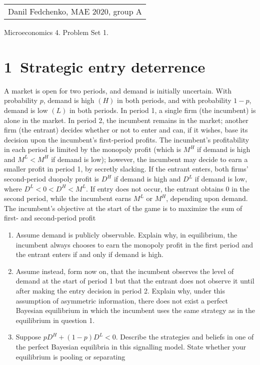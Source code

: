 \documentclass[a4paper]{article}
\begin{document}
	\begin{flushright}
	\begin{tabular}{r}
		Danil Fedchenko, MAE 2020, group A \\
	\end{tabular}
\end{flushright}


\begin{center}
	Microeconomics 4. Problem Set 1.
\end{center}
\section*{1\ Strategic entry deterrence}
A market is open for two periods, and demand is initially uncertain. With probability $p$,
demand is high $(H)$ in both periods, and with probability $1-p$, demand is low $(L)$ in both
periods. In period 1, a single firm (the incumbent) is alone in the market. In period 2,
the incumbent remains in the market; another firm (the entrant) decides whether or not
to enter and can, if it wishes, base its decision upon the incumbent's first-period profits.
The incumbent's profitability in each period is limited by the monopoly profit (which is
$M^H$ if demand is high and $M^L < M^H$ if demand is low); however, the incumbent may
decide to earn a smaller profit in period 1, by secretly slacking. If the entrant enters,
both firms' second-period duopoly profit is $D^H$ if demand is high and $D^L$
if demand
is low, where $D^L < 0 < D^H < M^L$. If entry does not occur, the entrant obtains 0
in the second period, while the incumbent earns $M^L$ or $M^H$, depending upon demand.
The incumbent's objective at the start of the game is to maximize the sum of first- and
second-period profit
\begin{enumerate}
	\item  Assume demand is publicly observable. Explain why, in equilibrium, the incumbent
	always chooses to earn the monopoly profit in the first period and the entrant enters
	if and only if demand is high.
	\item Assume instead, form now on, that the incumbent observes the level of demand at
	the start of period 1 but that the entrant does not observe it until after making
	the entry decision in period 2. Explain why, under this assumption of asymmetric information, there does not exist a perfect Bayesian equilibrium in which the
	incumbent uses the same strategy as in the equilibrium in question 1.
	\item Suppose $p D^H + (1-p)D^L < 0$. Describe the strategies and beliefs in one of the
	perfect Bayesian equilibria in this signalling model. State whether your equilibrium
	is pooling or separating
\end{enumerate}
\end{document}
